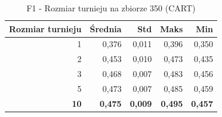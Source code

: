 \begin{table}[htbp]
\centering
\small
\setlength{\tabcolsep}{6pt}
\renewcommand{\arraystretch}{1.2}
\caption{F1 - Rozmiar turnieju na zbiorze 350 (CART)}
\label{tab:CART_tournament_size_350_f1}
\begin{tabular}{r|r|r|r|r}
\toprule
Rozmiar turnieju & Średnia & Std & Maks & Min \\
\hline
1 & 0,376 & 0,011 & 0,396 & 0,350 \\
2 & 0,453 & 0,010 & 0,473 & 0,435 \\
3 & 0,468 & 0,007 & 0,483 & 0,456 \\
5 & 0,473 & 0,007 & 0,485 & 0,459 \\
\textbf{10} & \textbf{0,475} & \textbf{0,009} & \textbf{0,495} & \textbf{0,457} \\
\bottomrule
\end{tabular}
\end{table}